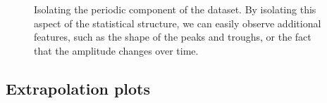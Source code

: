 \documentclass{article} %
\def\eg{e.g.\ }
\begin{document}
\begin{figure}[ht]
\centering
{}
\caption{Isolating the periodic component of the dataset.  By isolating this aspect of the statistical structure, we can easily observe additional features, such as the shape of the peaks and troughs, or the fact that the amplitude changes over time.}
\label{fig:periodic}
\end{figure}



\subsection{Extrapolation plots}
\end{document}
